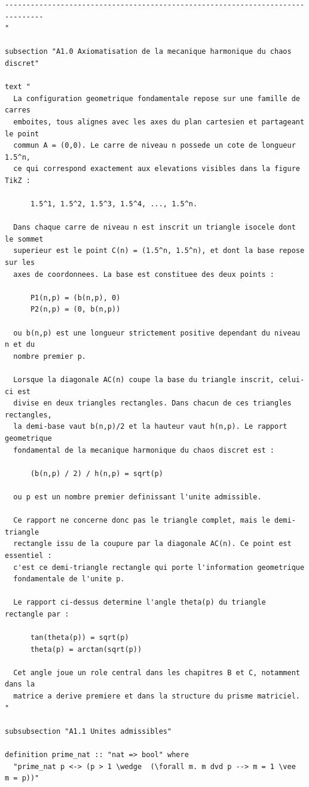 \documentclass[12pt,a4paper]{article}
\begin{document}
\begin{verbatim}
-------------------------------------------------------------------------------
"

subsection "A1.0 Axiomatisation de la mecanique harmonique du chaos discret"

text "
  La configuration geometrique fondamentale repose sur une famille de carres
  emboites, tous alignes avec les axes du plan cartesien et partageant le point
  commun A = (0,0). Le carre de niveau n possede un cote de longueur 1.5^n,
  ce qui correspond exactement aux elevations visibles dans la figure TikZ :

      1.5^1, 1.5^2, 1.5^3, 1.5^4, ..., 1.5^n.

  Dans chaque carre de niveau n est inscrit un triangle isocele dont le sommet
  superieur est le point C(n) = (1.5^n, 1.5^n), et dont la base repose sur les
  axes de coordonnees. La base est constituee des deux points :

      P1(n,p) = (b(n,p), 0)
      P2(n,p) = (0, b(n,p))

  ou b(n,p) est une longueur strictement positive dependant du niveau n et du
  nombre premier p.

  Lorsque la diagonale AC(n) coupe la base du triangle inscrit, celui-ci est
  divise en deux triangles rectangles. Dans chacun de ces triangles rectangles,
  la demi-base vaut b(n,p)/2 et la hauteur vaut h(n,p). Le rapport geometrique
  fondamental de la mecanique harmonique du chaos discret est :

      (b(n,p) / 2) / h(n,p) = sqrt(p)

  ou p est un nombre premier definissant l'unite admissible.

  Ce rapport ne concerne donc pas le triangle complet, mais le demi-triangle
  rectangle issu de la coupure par la diagonale AC(n). Ce point est essentiel :
  c'est ce demi-triangle rectangle qui porte l'information geometrique
  fondamentale de l'unite p.

  Le rapport ci-dessus determine l'angle theta(p) du triangle rectangle par :

      tan(theta(p)) = sqrt(p)
      theta(p) = arctan(sqrt(p))

  Cet angle joue un role central dans les chapitres B et C, notamment dans la
  matrice a derive premiere et dans la structure du prisme matriciel.
"

subsubsection "A1.1 Unites admissibles"

definition prime_nat :: "nat => bool" where
  "prime_nat p <-> (p > 1 \wedge  (\forall m. m dvd p --> m = 1 \vee  m = p))"


\end{verbatim}
\end{document}
